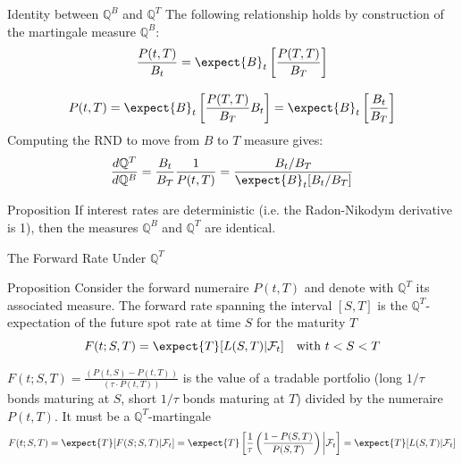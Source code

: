 \documentclass{beamer}
\begin{document}
	\begin{frame}{Identity between $\mathbb{Q}^B$ and $\mathbb{Q}^T$}
		The following relationship holds by construction of the martingale measure $\mathbb{Q}^B$:
		\begin{equation*}
			\begin{gathered}
				\frac{P(t,T)}{B_t}=\expect{B}_t\left[\frac{P(T,T)}{B_T}\right]\\[0.3cm]
				P(t,T)=\expect{B}_t\left[\frac{P(T,T)}{B_T}B_t\right] = \expect{B}_t\left[\frac{B_t}{B_T}\right]
			\end{gathered}
		\end{equation*}
		\pause
		Computing the RND to move from $B$ to $T$ measure gives:
		\begin{equation*}
			\frac{d\mathbb{Q}^T}{d\mathbb{Q}^B} = \frac{B_t}{B_T}\frac{1}{P(t,T)} =\frac{B_t/B_T}{\expect{B}_t[B_t/B_T]}
		\end{equation*}
		\myendproof
		\pause
		\begin{block}{Proposition}
			If interest rates are deterministic (i.e. the Radon-Nikodym derivative is 1), then the measures $\mathbb{Q}^B$ and $\mathbb{Q}^T$ are identical.
		\end{block}
	\end{frame}

	\begin{frame}{The Forward Rate Under $\mathbb{Q}^T$}
		\begin{block}{Proposition}
			Consider the forward numeraire $P(t,T)$ and denote with $\mathbb{Q}^T$ its associated measure.
			The forward rate spanning the interval $[S,T]$ is the $\mathbb{Q}^T$-expectation of the future spot rate at time $S$ for the maturity $T$
			\begin{equation}
				F(t;S,T) =\expect{T}[L(S,T)|\mathcal{F}_t]\quad \text{with }t<S<T
			\end{equation}
		\end{block}
		\vfill
		$F(t;S,T) = \frac{(P(t,S)-P(t,T))}{(\tau\cdot P(t,T))}$ is the value of a tradable portfolio (long $1/\tau$ bonds maturing at $S$, short $1/\tau$ bonds maturing at $T$) divided by the numeraire $P(t,T)$. It must be a $\mathbb{Q}^T$-martingale
		\begin{equation*}
			F(t;S,T) = \expect{T}[F(S;S,T)|\mathcal{F}_t] = \expect{T}\left[\frac{1}{\tau}\left(\frac{1-P(S,T)}{P(S,T)}\right)\bigg|\mathcal{F}_t\right] = \expect{T}[L(S,T)|\mathcal{F}_t]
		\end{equation*}
		\myendproof
	\end{frame}
\end{document}
